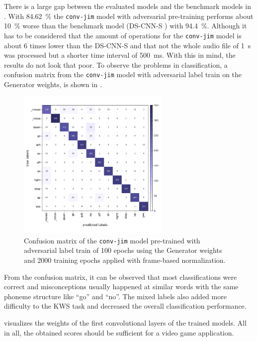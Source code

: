 There is a large gap between the evaluated models and the benchmark models in .
With \SI{84.62}{\percent} the \texttt{conv-jim} model with adversarial pre-training performs about \SI{10}{\percent} worse than the benchmark model (DS-CNN-S \cite{Zhang2017}) with \SI{94.4}{\percent}.
Although it has to be considered that the amount of operations for the \texttt{conv-jim} model is about 6 times lower than the DS-CNN-S and that not the whole audio file of \SI{1}{\second} was processed but a shorter time interval of \SI{500}{\milli\second}.
With this in mind, the results do not look that poor.
To observe the problems in classification, a confusion matrix from the \texttt{conv-jim} model with adversarial label train on the Generator weights, is shown in .
\begin{figure}[!ht]
  \centering
  \includegraphics[width=0.65\textwidth]{./5_exp/figs/exp_final_confusion.png}
  \caption{Confusion matrix of the \texttt{conv-jim} model pre-trained with adversarial label train of 100 epochs using the Generator weights and 2000 training epochs applied with frame-based normalization.}
  \label{fig:exp_final_confusion}
\end{figure}
\FloatBarrier
\noindent
From the confusion matrix, it can be observed that most classifications were correct and misconceptions usually happened at similar words with the same phoneme structure like \enquote{go} and \enquote{no}.
The mixed labels also added more difficulty to the KWS task and decreased the overall classification performance.

 visualizes the weights of the first convolutional layers of the trained models.
All in all, the obtained scores should be sufficient for a video game application.